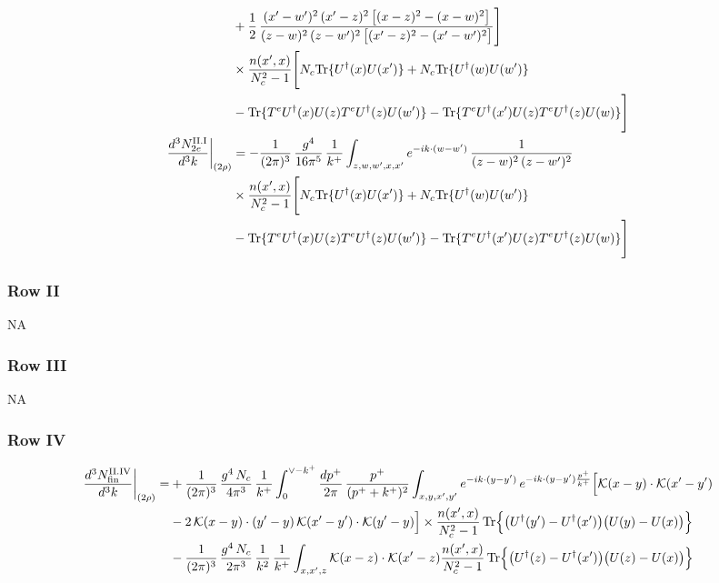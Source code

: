 \documentclass[9pt]{article}
\numberwithin{equation}{section}
\begin{document}
\begin{align}
&+\frac{1}{2}\,\frac{(x^{\prime}-w^{\prime})^{2}\,(x^{\prime}-z)^{2}\,\big[(x-z)^{2}-(x-w)^{2}\big]}{(z-w)^{2}\,(z-w^{\prime})^{2}\,\big[(x^{\prime}-z)^{2}-(x^{\prime}-w^{\prime})^{2}\big]}\Bigg]\notag\\ &\times\frac{n(x',x)}{N_{c}^{2}-1}\Bigg[N_{c}{\rm Tr}\{U^{\dagger}(x)U(x')\}+N_{c}{\rm Tr}\{U^{\dagger}(w)U(w')\}\notag\\ &-{\rm Tr}\{T^{e}U^{\dagger}(x)U(z)T^{e}U^{\dagger}(z)U(w')\}-{\rm Tr}\{T^{e}U^{\dagger}(x')U(z)T^{e}U^{\dagger}(z)U(w)\}\Bigg]\\
\frac{d^{3}N^{\rm II.I}_{2e}}{d^{3}k}\bigg|_{(2\rho)}&= -\frac{1}{(2\pi)^{3}}\,\frac{g^{4}}{16\pi^{5}}\,\frac{1}{k^{+}}\int_{z,w,w^{\prime},x,x^{\prime}}e^{-ik\cdot(w-w^{\prime})}\,\frac{1}{(z-w)^{2}\,(z-w^{\prime})^{2}}\notag\\ &\times\frac{n(x',x)}{N_{c}^{2}-1}\Bigg[N_{c}{\rm Tr}\{U^{\dagger}(x)U(x')\}+N_{c}{\rm Tr}\{U^{\dagger}(w)U(w')\}\notag\\ &-{\rm Tr}\{T^{e}U^{\dagger}(x)U(z)T^{e}U^{\dagger}(z)U(w')\}-{\rm Tr}\{T^{e}U^{\dagger}(x')U(z)T^{e}U^{\dagger}(z)U(w)\}\Bigg]\notag
\end{align}
\subsubsection*{Row II}
\textsc{NA}
\subsubsection*{Row III}
\textsc{NA}
\subsubsection*{Row IV}

\begin{align}
\frac{d^{3}N^{\rm II.IV}_{\rm fin}}{d^{3}k}\bigg|_{(2\rho)}= &  +\frac{1}{(2\pi)^{3}}\,\frac{g^{4}\,N_{c}}{4\pi^{3}}\,\frac{1}{k^{+}}\int_{0}^{\vee-k^{+}}\frac{dp^{+}}{2\pi}\,\frac{p^{+}}{(p^{+}+k^{+})^{2}}\int_{x,y,x',y'}e^{-ik\cdot(y-y')}\,e^{-ik\cdot(y-y')\frac{p^{+}}{k^{+}}}\Big[\mathcal{K}(x-y)\cdot\mathcal{K}(x'-y')\notag \\ & -2\,\mathcal{K}(x-y)\cdot(y'-y)\,\mathcal{K}(x'-y')\cdot\mathcal{K}(y'-y)\Big]\times\frac{n(x',x)}{N_{c}^{2}-1}\,{\rm Tr}\Big\{\big(U^{\dagger}(y')-U^{\dagger}(x')\big)\big(U(y)-U(x)\big)\Big\}\notag \\ & -\frac{1}{(2\pi)^{3}}\,\frac{g^{4}\,N_{c}}{2\pi^{3}}\,\frac{1}{k^{2}}\,\frac{1}{k^{+}}\int_{x,x',z}\mathcal{K}(x-z)\cdot\mathcal{K}(x'-z)\frac{n(x',x)}{N_{c}^{2}-1}\,{\rm Tr}\Big\{\big(U^{\dagger}(z)-U^{\dagger}(x')\big)\big(U(z)-U(x)\big)\Big\}\label{eq:E-II.IVrem}
\end{align}
\end{document}
